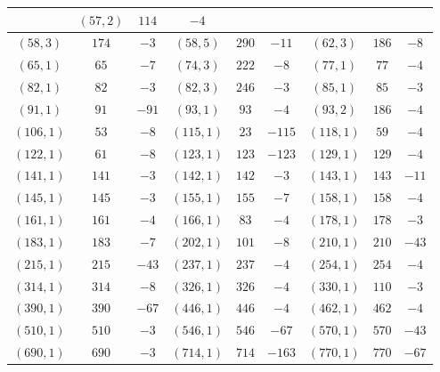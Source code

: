 \documentclass[11pt,reqno]{amsart}
\theoremstyle{definition}
\begin{document}
{\begin{longtable}{|c|c|c||c|c|c||c|c|c|}
 & 
$ (
57 , 2 )$ & $
114 $ & $ -4 $
\\ \hline
$ (
58 , 3 )$ & $
174 $ & $ -3 $
 & 
$ (
58 , 5 )$ & $
290 $ & $ -11 $
 & 
$ (
62 , 3 )$ & $
186 $ & $ -8 $
\\ \hline
$ (
65 , 1 )$ & $
65 $ & $ -7 $
 & 
$ (
74 , 3 )$ & $
222 $ & $ -8 $
 & 
$ (
77 , 1 )$ & $
77 $ & $ -4 $
\\ \hline
$ (
82 , 1 )$ & $
82 $ & $ -3 $
 & 
$ (
82 , 3 )$ & $
246 $ & $ -3 $
 & 
$ (
85 , 1 )$ & $
85 $ & $ -3 $
\\ \hline
$ (
91 , 1 )$ & $
91 $ & $ -91 $
 & 
$ (
93 , 1 )$ & $
93 $ & $ -4 $
 & 
$ (
93 , 2 )$ & $
186 $ & $ -4 $
\\ \hline
$ (
106 , 1 )$ & $
53 $ & $ -8 $
 & 
$ (
115 , 1 )$ & $
23 $ & $ -115 $
 & 
$ (
118 , 1 )$ & $
59 $ & $ -4 $
\\ \hline
$ (
122 , 1 )$ & $
61 $ & $ -8 $
 & 
$ (
123 , 1 )$ & $
123 $ & $ -123 $
 & 
$ (
129 , 1 )$ & $
129 $ & $ -4 $
\\ \hline
$ (
141 , 1 )$ & $
141 $ & $ -3 $
 & 
$ (
142 , 1 )$ & $
142 $ & $ -3 $
 & 
$ (
143 , 1 )$ & $
143 $ & $ -11 $
\\ \hline
$ (
145 , 1 )$ & $
145 $ & $ -3 $
 & 
$ (
155 , 1 )$ & $
155 $ & $ -7 $
 & 
$ (
158 , 1 )$ & $
158 $ & $ -4 $
\\ \hline
$ (
161 , 1 )$ & $
161 $ & $ -4 $
 & 
$ (
166 , 1 )$ & $
83 $ & $ -4 $
 & 
$ (
178 , 1 )$ & $
178 $ & $ -3 $
\\ \hline
$ (
183 , 1 )$ & $
183 $ & $ -7 $
 & 
$ (
202 , 1 )$ & $
101 $ & $ -8 $
 & 
$ (
210 , 1 )$ & $
210 $ & $ -43 $
\\ \hline
$ (
215 , 1 )$ & $
215 $ & $ -43 $
 & 
$ (
237 , 1 )$ & $
237 $ & $ -4 $
 & 
$ (
254 , 1 )$ & $
254 $ & $ -4 $
\\ \hline
$ (
314 , 1 )$ & $
314 $ & $ -8 $
 & 
$ (
326 , 1 )$ & $
326 $ & $ -4 $
 & 
$ (
330 , 1 )$ & $
110 $ & $ -3 $
\\ \hline
$ (
390 , 1 )$ & $
390 $ & $ -67 $
 & 
$ (
446 , 1 )$ & $
446 $ & $ -4 $
 & 
$ (
462 , 1 )$ & $
462 $ & $ -4 $
\\ \hline
$ (
510 , 1 )$ & $
510 $ & $ -3 $
 & 
$ (
546 , 1 )$ & $
546 $ & $ -67 $
 & 
$ (
570 , 1 )$ & $
570 $ & $ -43 $
\\ \hline
$ (
690 , 1 )$ & $
690 $ & $ -3 $
 & 
$ (
714 , 1 )$ & $
714 $ & $ -163 $
 & 
$ (
770 , 1 )$ & $
770 $ & $ -67 $
\\ \hline
\end{longtable}
}
\end{document}

